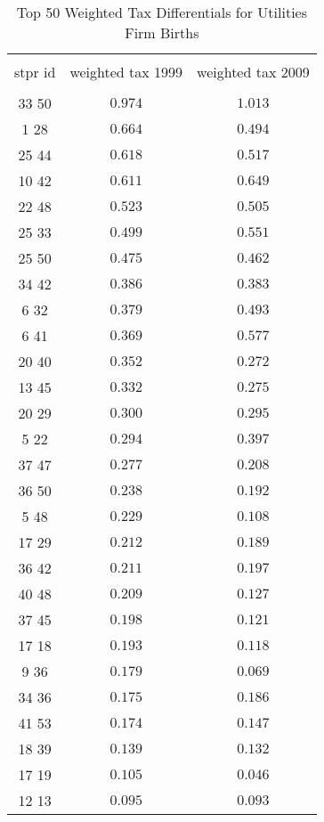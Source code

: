 
\begin{table}[!htbp] \centering 
  \caption{Top 50 Weighted Tax Differentials for  Utilities Firm Births} 
  \label{} 
\tiny 
\begin{tabular}{@{\extracolsep{5pt}} ccc} 
\\[-1.8ex]\hline 
\hline \\[-1.8ex] 
stpr id & weighted tax 1999 & weighted tax 2009 \\ 
\hline \\[-1.8ex] 
33 50  & $0.974$ & $1.013$ \\ 
1 28  & $0.664$ & $0.494$ \\ 
25 44  & $0.618$ & $0.517$ \\ 
10 42  & $0.611$ & $0.649$ \\ 
22 48  & $0.523$ & $0.505$ \\ 
25 33  & $0.499$ & $0.551$ \\ 
25 50  & $0.475$ & $0.462$ \\ 
34 42  & $0.386$ & $0.383$ \\ 
6 32  & $0.379$ & $0.493$ \\ 
6 41  & $0.369$ & $0.577$ \\ 
20 40  & $0.352$ & $0.272$ \\ 
13 45  & $0.332$ & $0.275$ \\ 
20 29  & $0.300$ & $0.295$ \\ 
5 22  & $0.294$ & $0.397$ \\ 
37 47  & $0.277$ & $0.208$ \\ 
36 50  & $0.238$ & $0.192$ \\ 
5 48  & $0.229$ & $0.108$ \\ 
17 29  & $0.212$ & $0.189$ \\ 
36 42  & $0.211$ & $0.197$ \\ 
40 48  & $0.209$ & $0.127$ \\ 
37 45  & $0.198$ & $0.121$ \\ 
17 18  & $0.193$ & $0.118$ \\ 
9 36  & $0.179$ & $0.069$ \\ 
34 36  & $0.175$ & $0.186$ \\ 
41 53  & $0.174$ & $0.147$ \\ 
18 39  & $0.139$ & $0.132$ \\ 
17 19  & $0.105$ & $0.046$ \\ 
12 13  & $0.095$ & $0.093$ \\ 

\end{tabular}
\end{table}

